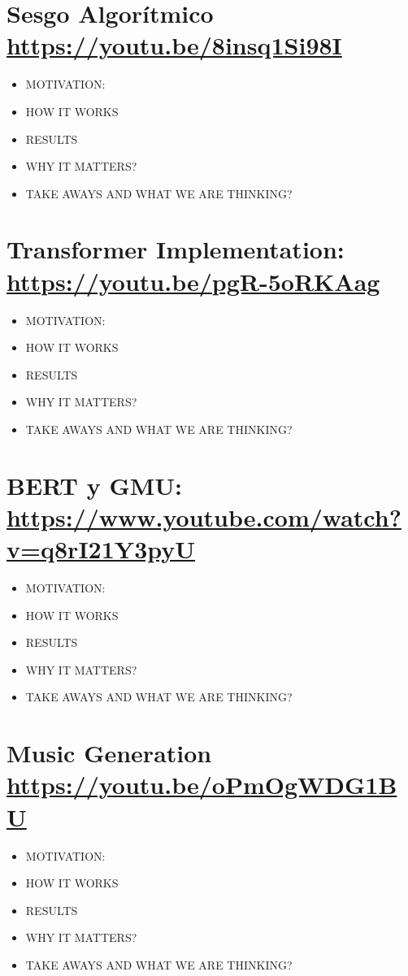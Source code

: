 \documentclass[letter, 11pt, twoside]{report}
\begin{document}
\section*{Sesgo Algorítmico \color{mirosa}\url{https://youtu.be/8insq1Si98I}}
\begin{itemize}
    \item MOTIVATION:
    \item HOW IT WORKS
    \item RESULTS
    \item WHY IT MATTERS?
    \item TAKE AWAYS AND WHAT WE ARE THINKING?
\end{itemize}

\section*{Transformer Implementation: \color{mirosa}\url{https://youtu.be/pgR-5oRKAag }}
\begin{itemize}
    \item MOTIVATION:
    \item HOW IT WORKS
    \item RESULTS
    \item WHY IT MATTERS?
    \item TAKE AWAYS AND WHAT WE ARE THINKING?
\end{itemize}

\section*{BERT y GMU: \color{mirosa}\url{https://www.youtube.com/watch?v=q8rI21Y3pyU}}
\begin{itemize}
    \item MOTIVATION:
    \item HOW IT WORKS
    \item RESULTS
    \item WHY IT MATTERS?
    \item TAKE AWAYS AND WHAT WE ARE THINKING?
\end{itemize}
\section*{Music Generation \color{mirosa}\url{https://youtu.be/oPmOgWDG1BU}}
\begin{itemize}
    \item MOTIVATION:
    \item HOW IT WORKS
    \item RESULTS
    \item WHY IT MATTERS?
    \item TAKE AWAYS AND WHAT WE ARE THINKING?
\end{itemize}
\end{document}
